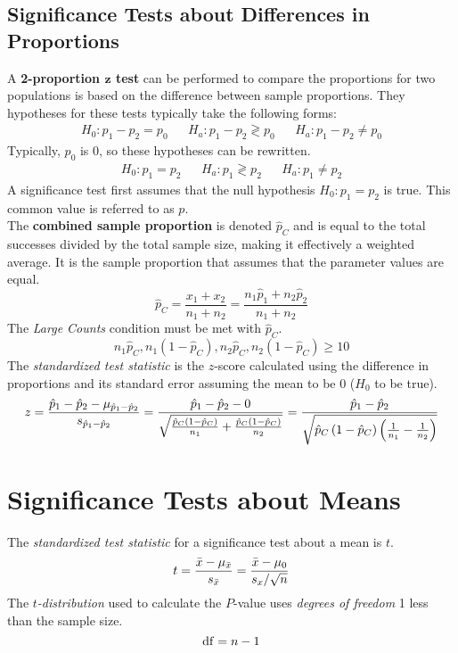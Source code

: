 \documentclass[../AP_Statistics.tex]{subfiles}
\begin{document}
			\subsection*{Significance Tests about Differences in Proportions}
				A \textbf{2-proportion $\pmb{z}$ test} can be performed to compare the proportions for two populations is based on the difference between sample proportions. They hypotheses for these tests typically take the following forms:
				\begin{align*}
					H_0:p_1 - p_2 = p_0 && H_a: p_1 - p_2 \gtrless p_0 && H_a:p_1 - p_2 \ne p_0
				\end{align*}
				Typically, $p_0$ is 0, so these hypotheses can be rewritten.
				\begin{align*}
					H_0:p_1 = p_2 && H_a:p_1 \gtrless p_2 && H_a:p_1 \ne p_2
				\end{align*}
				A significance test first assumes that the null hypothesis $H_0:p_1 = p_2$ is true. This common value is referred to as $p$. \\
				The \textbf{combined sample proportion} is denoted $\hat{p}_C$ and is equal to the total successes divided by the total sample size, making it effectively a weighted average. It is the sample proportion that assumes that the parameter values are equal.
				\[\hat{p}_C = \frac{x_1 + x_2}{n_1 + n_2} = \frac{n_1\hat{p}_1 + n_2\hat{p}_2}{n_1 + n_2}\]
				The \emph{Large Counts} condition must be met with $\hat{p}_C$.
				\[n_1\hat{p}_C, n_1(1 - \hat{p}_C), n_2\hat{p}_C, n_2(1 - \hat{p}_C) \ge 10\]
				The \emph{standardized test statistic} is the $z$-score calculated using the difference in proportions and its standard error assuming the mean to be 0 ($H_0$ to be true).
				\[z = \frac{\hat{p}_1 - \hat{p}_2 - \mu_{\hat{p}_1 - \hat{p}_2}}{s_{\hat{p}_1 - \hat{p}_2}} = \frac{\hat{p}_1 - \hat{p}_2 - 0}{\sqrt{\frac{\hat{p}_C\left(1 - \hat{p}_C\right)}{n_1} + \frac{\hat{p}_C\left(1 - \hat{p}_C\right)}{n_2}}} = \frac{\hat{p}_1 - \hat{p}_2}{\sqrt{\hat{p}_C\left(1 - \hat{p}_C\right)\left(\frac{1}{n_1} - \frac{1}{n_2}\right)}}\]
		\section{Significance Tests about Means}
			The \emph{standardized test statistic} for a significance test about a mean is $t$.
			\[t = \frac{\bar{x} - \mu_{\bar{x}}}{s_{\bar{x}}} = \frac{\bar{x} - \mu_0}{s_x/\sqrt{n}}\]
			The \emph{$t$-distribution} used to calculate the $P$-value uses \emph{degrees of freedom} 1 less than the sample size.
			\[\operatorname{\mathrm{df}} = n - 1\]
\end{document}
